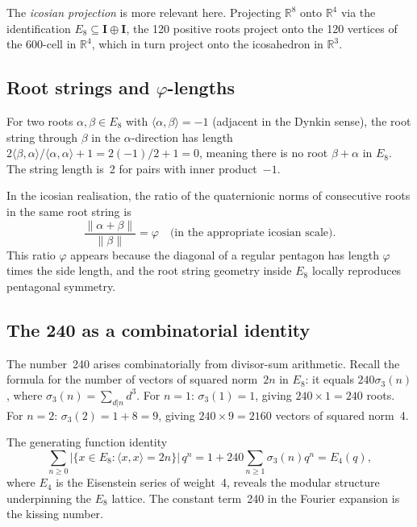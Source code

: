 The \emph{icosian projection} is more relevant here.  Projecting
\(\mathbb{R}^8\) onto \(\mathbb{R}^4\) via the identification
\(E_8 \subseteq \mathbf{I} \oplus \mathbf{I}\), the 120 positive
roots project onto the 120 vertices of the 600-cell in
\(\mathbb{R}^4\), which in turn project onto the icosahedron in
\(\mathbb{R}^3\).

\subsection{Root strings and \texorpdfstring{$\varphi$}{φ}-lengths}
\label{subsec:strand1-strings}

For two roots \(\alpha, \beta \in E_8\) with
\(\langle \alpha, \beta \rangle = -1\) (adjacent in the Dynkin
sense), the root string through \(\beta\) in the \(\alpha\)-direction
has length \(2\langle \beta, \alpha\rangle /
\langle \alpha, \alpha \rangle + 1 = 2(-1)/2 + 1 = 0\), meaning
there is no root \(\beta + \alpha\) in \(E_8\).  The string length
is~2 for pairs with inner product~\(-1\).

In the icosian realisation, the ratio of the quaternionic norms of
consecutive roots in the same root string is
\[
  \frac{\|\alpha + \beta\|}{\|\beta\|} = \varphi
  \quad \text{(in the appropriate icosian scale)}.
\]
This ratio \(\varphi\) appears because the diagonal of a regular
pentagon has length \(\varphi\) times the side length, and the root
string geometry inside \(E_8\) locally reproduces pentagonal
symmetry.

\subsection{The 240 as a combinatorial identity}
\label{subsec:strand1-combinatorial}

The number~240 arises combinatorially from divisor-sum arithmetic.
Recall the formula for the number of vectors of squared norm~\(2n\)
in \(E_8\): it equals \(240 \sigma_3(n)\), where
\(\sigma_3(n) = \sum_{d|n} d^3\).  For \(n = 1\): \(\sigma_3(1) = 1\),
giving \(240 \times 1 = 240\) roots.  For \(n = 2\): \(\sigma_3(2) =
1 + 8 = 9\), giving \(240 \times 9 = 2160\) vectors of squared
norm~4.

The generating function identity
\[
  \sum_{n \geq 0} |\{x \in E_8 : \langle x,x\rangle = 2n\}|\, q^n
  = 1 + 240 \sum_{n \geq 1} \sigma_3(n) q^n
  = E_4(q),
\]
where \(E_4\) is the Eisenstein series of weight~4, reveals the
modular structure underpinning the \(E_8\) lattice.  The constant
term~240 in the Fourier expansion is the kissing number.

